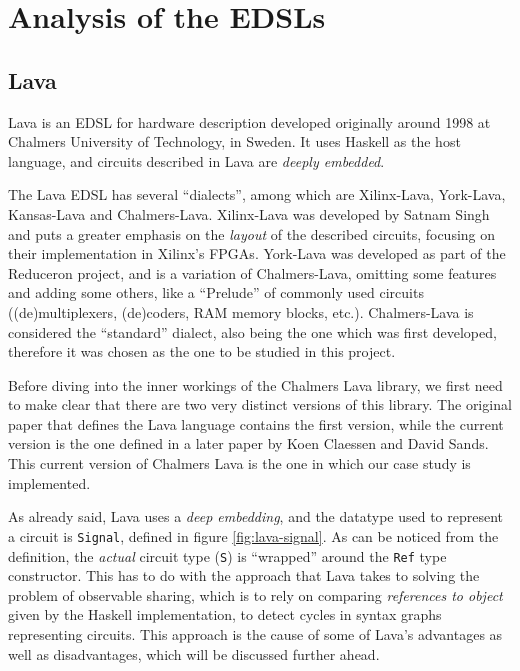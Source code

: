 \documentclass[a4paper]{article}
\begin{document}
    \section{Analysis of the EDSLs}
    \label{sec:edsls}

        \subsection{Lava}
        \label{subsec:lava}
            Lava\cite{lava1998} is an EDSL for hardware description developed originally around 1998
            at Chalmers University of Technology, in Sweden. It uses Haskell as the host language,
            and circuits described in Lava are \emph{deeply embedded}.

            The Lava EDSL has several ``dialects'', among which are Xilinx-Lava, York-Lava,
            Kansas-Lava and Chalmers-Lava. Xilinx-Lava\cite{xilinx-lava} was developed by Satnam
            Singh and puts a greater emphasis on the \emph{layout} of the described circuits,
            focusing on their implementation in Xilinx's FPGAs. York-Lava was developed as part of
            the Reduceron\cite{reduceron} project, and is a variation of Chalmers-Lava, omitting
            some features and adding some others, like a ``Prelude'' of commonly used circuits
            ((de)multiplexers, (de)coders, RAM memory blocks, etc.). Chalmers-Lava is considered the
            ``standard'' dialect, also being the one which was first developed, therefore it was
            chosen as the one to be studied in this project.

            Before diving into the inner workings of the Chalmers Lava library, we first need to
            make clear that there are two very distinct versions of this library. The original paper
            that defines the Lava language\cite{lava1998} contains the first version, while the
            current version is the one defined in a later paper\cite{observable-sharing-1999} by
            Koen Claessen and David Sands. This current version of Chalmers Lava is the one in which
            our case study is implemented.

            As already said, Lava uses a \emph{deep embedding}, and the datatype used to represent a
            circuit is \texttt{Signal}, defined in figure \ref{fig:lava-signal}. As can be noticed
            from the definition, the \emph{actual} circuit type (\texttt{S}) is ``wrapped'' around
            the \texttt{Ref} type constructor. This has to do with the approach that Lava takes to
            solving the problem of observable sharing, which is to rely on comparing
            \emph{references to object} given by the Haskell implementation, to detect cycles in
            syntax graphs representing circuits. This approach is the cause of some of Lava's
            advantages as well as disadvantages, which will be discussed further ahead.
\end{document}
